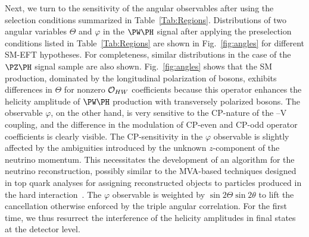 \documentclass[a4paper,11pt]{article}
\renewcommand{\PV}{{{{V}}}\xspace}
\begin{document}
Next, we turn to the sensitivity of the angular observables after using the selection conditions summarized in Table~\ref{Tab:Regions}. 
Distributions of two angular variables $\Theta$ and $\varphi$ in the $\PW\PH$ signal after applying the preselection conditions listed in Table~\ref{Tab:Regions} are shown in Fig.~\ref{fig:angles} for different SM-EFT hypotheses. 
For completeness, similar distributions in the case of the $\PZ\PH$ signal sample are also shown.
Fig.~\ref{fig:angles} shows that
the SM production, dominated by the longitudinal polarization of \PW bosons, exhibits differences in $\Theta$ for nonzero ${\cal O}_{HW}$ coefficients because this operator  enhances the helicity amplitude of $\PW\PH$ production with transversely polarized {\PW} bosons. %
The observable $\varphi$, on the other hand, is very sensitive to the CP-nature of the \PH--\PV coupling, and the difference in the modulation of CP-even and CP-odd operator coefficients is clearly visible.  
The CP-sensitivity in the $\varphi$ observable is slightly affected by the ambiguities introduced by the unknown $z$-component of the neutrino momentum. %
This necessitates the development of an algorithm for the neutrino reconstruction, possibly similar to the MVA-based techniques designed in top quark analyses for assigning reconstructed objects to particles produced in the hard interaction~\cite{CMS:2019esx}.
The $\varphi$ observable is weighted by $\sin2\Theta\sin2\theta$ to lift the cancellation otherwise enforced by the triple angular correlation. 
For the first time, we thus resurrect the interference of the helicity amplitudes in \PH final states at the detector level. 
\end{document}
